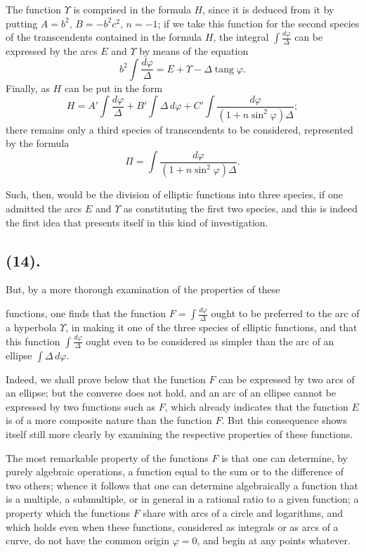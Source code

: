 \documentclass{article}
\begin{document}
The function $\Upsilon$ is comprised in the formula $H$, since it is deduced from it by putting $A=b^{2}$, $B=-b^{2}c^{2}$, $n=-1$; if we take this function for the second species of the transcendents contained in the formula $H$, the integral $\displaystyle\int\frac{d\varphi}{\Delta}$ can be expressed by the arcs $E$ and $\Upsilon$ by means of the equation
\[ b^{2}\int\frac{d\varphi}{\Delta}=E+\Upsilon-\Delta\operatorname{tang}\varphi. \]
Finally, as $H$ can be put in the form
\[ H=A'\int\frac{d\varphi}{\Delta}+B'\int\Delta\,d\varphi+C'\int\frac{d\varphi}{(1+n\sin^{2}\varphi)\Delta}; \]
there remains only a third species of transcendents to be considered, represented by the formula
\[ \Pi=\int\frac{d\varphi}{(1+n\sin^{2}\varphi)\Delta}. \]

Such, then, would be the division of elliptic functions into three species, if one admitted the arcs $E$ and $\Upsilon$ as constituting the first two species, and this is indeed the first idea that presents itself in this kind of investigation.

\subsection*{(14).}

But, by a more thorough examination of the properties of these

functions, one finds that the function $F=\displaystyle\int\frac{d\varphi}{\Delta}$ ought to be preferred to the arc of a hyperbola $\Upsilon$, in making it one of the three species of elliptic functions, and that this function $\displaystyle\int\frac{d\varphi}{\Delta}$ ought even to be considered as simpler than the arc of an ellipse $\displaystyle\int\Delta\,d\varphi$.

Indeed, we shall prove below that the function $F$ can be expressed by two arcs of an ellipse; but the converse does not hold, and an arc of an ellipse cannot be expressed by two functions such as $F$, which already indicates that the function $E$ is of a more composite nature than the function $F$. But this consequence shows itself still more clearly by examining the respective properties of these functions.

The most remarkable property of the functions $F$ is that one can determine, by purely algebraic operations, a function equal to the sum or to the difference of two others; whence it follows that one can determine algebraically a function that is a multiple, a submultiple, or in general in a rational ratio to a given function; a property which the functions $F$ share with arcs of a circle and logarithms, and which holds even when these functions, considered as integrals or as arcs of a curve, do not have the common origin $\varphi=0$, and begin at any points whatever.
\end{document}
